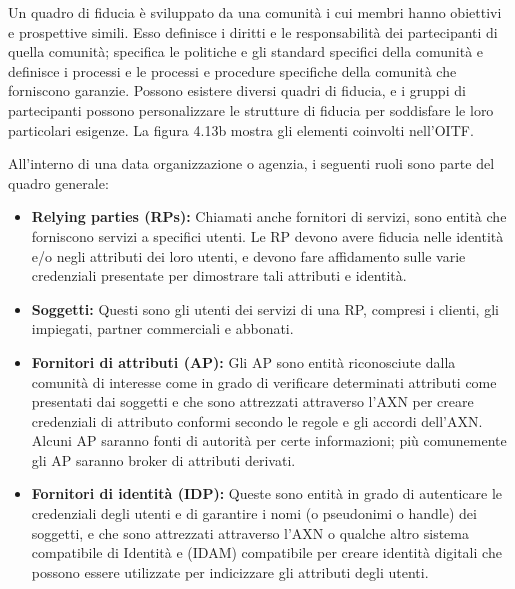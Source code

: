 Un quadro di fiducia è sviluppato da una comunità i cui membri hanno obiettivi e prospettive simili. Esso definisce i diritti e le responsabilità dei partecipanti di quella comunità; specifica le politiche e gli standard specifici della comunità e definisce i processi e le processi e procedure specifiche della comunità che forniscono garanzie. Possono esistere diversi quadri di fiducia, e i gruppi di partecipanti possono personalizzare le strutture di fiducia per soddisfare le loro particolari esigenze. La figura 4.13b mostra gli elementi coinvolti nell'OITF.

\singlespacing

All'interno di una data organizzazione o agenzia, i seguenti ruoli sono parte del quadro generale:

\begin{itemize}
    \item \textbf{Relying parties (RPs):} Chiamati anche fornitori di servizi, sono entità che forniscono servizi a specifici utenti. Le RP devono avere fiducia nelle identità e/o negli attributi dei loro utenti, e devono fare affidamento sulle varie credenziali presentate per dimostrare tali attributi e identità.

    \item \textbf{Soggetti:} Questi sono gli utenti dei servizi di una RP, compresi i clienti, gli impiegati, partner commerciali e abbonati.

    \item \textbf{Fornitori di attributi (AP):} Gli AP sono entità riconosciute dalla comunità di interesse come in grado di verificare determinati attributi come presentati dai soggetti e che sono attrezzati attraverso l'AXN per creare credenziali di attributo conformi secondo le regole e gli accordi dell'AXN. Alcuni AP saranno fonti di autorità per certe informazioni; più comunemente gli AP saranno broker di attributi derivati.

    \item \textbf{Fornitori di identità (IDP):} Queste sono entità in grado di autenticare le credenziali degli utenti e di garantire i nomi (o pseudonimi o handle) dei soggetti, e che sono attrezzati attraverso l'AXN o qualche altro sistema compatibile di Identità e (IDAM) compatibile per creare identità digitali che possono essere utilizzate per indicizzare gli attributi degli utenti.
\end{itemize}

